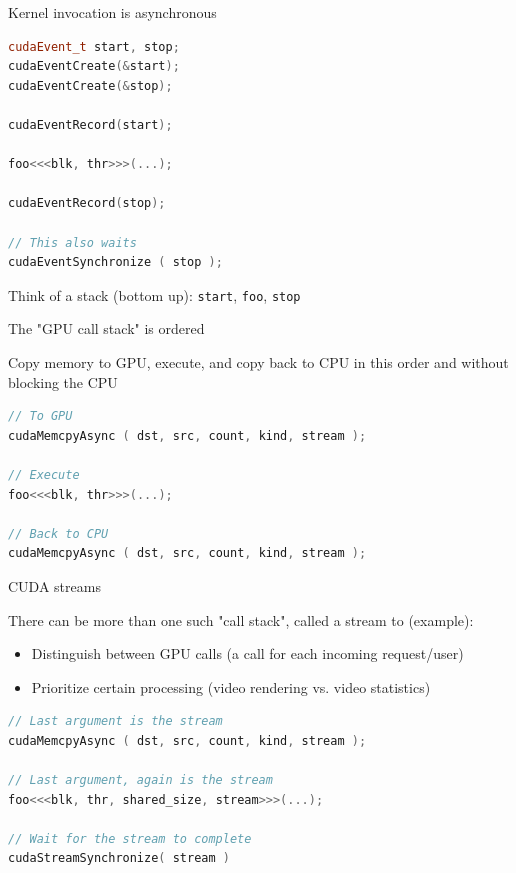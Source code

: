 \documentclass[11pt,t]{beamer}
\newcommand{\inline}[1]{ \colorbox{mygray}{\lstinline{#1}}}
\begin{document}
\begin{frame}[fragile]{Kernel invocation is asynchronous}

\begin{lstlisting}[language=C++]
cudaEvent_t start, stop;
cudaEventCreate(&start);
cudaEventCreate(&stop);

cudaEventRecord(start);

foo<<<blk, thr>>>(...);

cudaEventRecord(stop);

// This also waits 
cudaEventSynchronize ( stop );
\end{lstlisting}

\vspace{0.5em}

Think of a stack (bottom up): \inline{start}, \inline{foo}, \inline{stop}

\end{frame}


\begin{frame}[fragile]{The "GPU call stack" is ordered}

Copy memory to GPU, execute, and copy back to CPU in this order and without blocking the CPU
\vspace{0.5em}

\begin{lstlisting}[language=C++]
// To GPU
cudaMemcpyAsync ( dst, src, count, kind, stream );

// Execute
foo<<<blk, thr>>>(...);

// Back to CPU
cudaMemcpyAsync ( dst, src, count, kind, stream );

\end{lstlisting}

\end{frame}


\begin{frame}[fragile]{CUDA streams}

There can be more than one such "call stack", called a stream to (example):

\vspace{0.5em}
\begin{itemize}\setlength\itemsep{0.5em}
    \item Distinguish between GPU calls (a call for each incoming request/user)
    \item Prioritize certain processing (video rendering vs. video statistics)
\end{itemize}
\vspace{0.25em}

\begin{lstlisting}[language=C++]
// Last argument is the stream
cudaMemcpyAsync ( dst, src, count, kind, stream );

// Last argument, again is the stream
foo<<<blk, thr, shared_size, stream>>>(...);

// Wait for the stream to complete
cudaStreamSynchronize( stream )
\end{lstlisting}

\end{frame}
\end{document}
